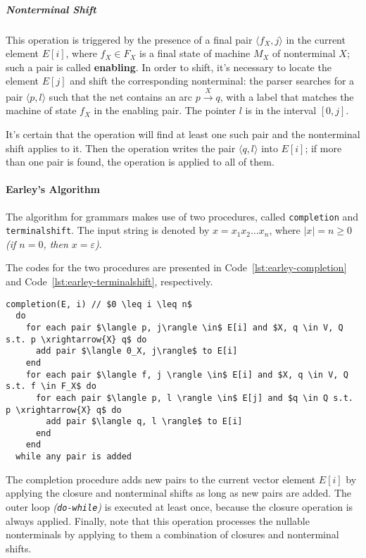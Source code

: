 \documentclass[english]{article}
\begin{document}
\subparagraph*{Nonterminal Shift}

This operation is triggered by the presence of a final pair \(\langle f_X, j \rangle\) in the current element \(E[i]\), where \(f_X \in F_X\) is a final state of machine \(M_X\) of nonterminal \(X\);
such a pair is called \textbf{enabling}.
In order to shift, it's necessary to locate the element \(E[j]\) and shift the corresponding nonterminal:
the parser searches for a pair \(\langle p, l \rangle\) such that the net contains an arc \(p \xrightarrow{X} q\), with a label that matches the machine of state \(f_X\) in the enabling pair.
The pointer \(l\) is in the interval \(\left[ 0, j \right]\).

It's certain that the operation will find at least one such pair and the nonterminal shift applies to it.
Then the operation writes the pair \(\langle q, l\rangle\) into \(E[i]\); if more than one pair is found, the operation is applied to all of them.

\paragraph{Earley's Algorithm}

The algorithm for \EBNF grammars makes use of two procedures, called \texttt{completion} and \texttt{terminalshift}.
The input string is denoted by \(x = x_1 x_2 \ldots x_n\), where \(|x| = n \geq 0\) \textit{(if \(n = 0\), then \(x = \varepsilon\))}.

The codes for the two procedures are presented in Code~\ref{lst:earley-completion} and Code~\ref{lst:earley-terminalshift}, respectively.

\begin{lstlisting}[caption={\texttt{completion} procedure}, label={lst:earley-completion}]
completion(E, i) // $0 \leq i \leq n$
  do
    for each pair $\langle p, j\rangle \in$ E[i] and $X, q \in V, Q s.t. p \xrightarrow{X} q$ do
      add pair $\langle 0_X, j\rangle$ to E[i]
    end
    for each pair $\langle f, j \rangle \in$ E[i] and $X, q \in V, Q s.t. f \in F_X$ do
      for each pair $\langle p, l \rangle \in$ E[j] and $q \in Q s.t. p \xrightarrow{X} q$ do
        add pair $\langle q, l \rangle$ to E[i]
      end
    end
  while any pair is added
\end{lstlisting}

The completion procedure adds new pairs to the current vector element \(E[i]\) by applying the closure and nonterminal shifts as long as new pairs are added.
The outer loop \textit{(\texttt{do-while})} is executed at least once, because the closure operation is always applied.
Finally, note that this operation processes the nullable nonterminals by applying to them a combination of closures and nonterminal shifts.
\end{document}
